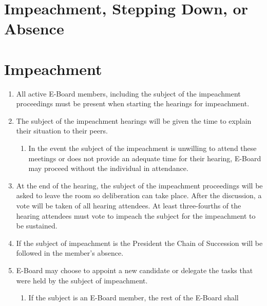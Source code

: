 
\section{Impeachment, Stepping Down, or Absence}

\section{Impeachment}

\begin{enumerate}
  \item All active E-Board members, including the subject of the impeachment
    proceedings must be present when starting the hearings for impeachment.
  \item The subject of the impeachment hearings will be given the time to
    explain their situation to their peers.
  \begin{enumerate}
    \item In the event the subject of the impeachment is unwilling to attend
      these meetings or does not provide an adequate time for their hearing,
      E-Board may proceed without the individual in attendance.
  \end{enumerate}
  \item At the end of the hearing, the subject of the impeachment proceedings
    will be asked to leave the room so deliberation can take place. After the
    discussion, a vote will be taken of all hearing attendees. At least
    three-fourths of the hearing attendees must vote to impeach the subject for
    the impeachment to be sustained.
  \item If the subject of impeachment is the President the Chain of Succession
    will be followed in the member’s absence.
  \item E-Board may choose to appoint a new candidate or delegate the tasks
    that were held by the subject of impeachment.
  \begin{enumerate}
    \item If the subject is an E-Board member, the rest of the E-Board shall

\end{enumerate}
\end{enumerate}
